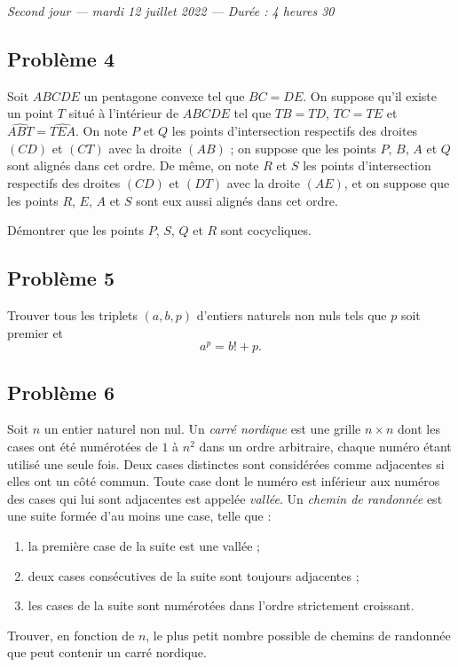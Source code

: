\bigskip
\begin{center}
  \emph{Second jour --- mardi 12 juillet 2022 --- Durée : 4 heures 30}
\end{center}

\subsection*{Problème 4}
Soit $ABCDE$ un pentagone convexe tel que $BC = DE$. On suppose qu'il existe un point $T$ situé à
l'intérieur de $ABCDE$ tel que $TB = TD$, $TC = TE$ et $\widehat{ABT} = \widehat{TEA}$. On note $P$ et $Q$ les
points d'intersection respectifs des droites $(CD)$ et $(CT)$ avec la droite $(AB)$ ; on suppose que les
points $P$, $B$, $A$ et $Q$ sont alignés dans cet ordre. De même, on note $R$ et $S$ les points
d'intersection respectifs des droites $(CD)$ et $(DT)$ avec la droite $(AE)$, et on suppose que les points
$R$, $E$, $A$ et $S$ sont eux aussi alignés dans cet ordre.

Démontrer que les points $P$, $S$, $Q$ et $R$ sont cocycliques.

\subsection*{Problème 5}
Trouver tous les triplets $(a, b, p)$ d'entiers naturels non nuls tels que $p$ soit premier et
\[
a^p = b! + p.
\]

\subsection*{Problème 6}
Soit $n$ un entier naturel non nul. Un \emph{carré nordique} est une grille $n \times n$ dont les cases ont
été numérotées de $1$ à $n^2$ dans un ordre arbitraire, chaque numéro étant utilisé une seule fois. Deux
cases distinctes sont considérées comme adjacentes si elles ont un côté commun. Toute case dont le numéro
est inférieur aux numéros des cases qui lui sont adjacentes est appelée \emph{vallée}.
Un \emph{chemin de randonnée} est une suite formée d'au moins une case, telle que :
\begin{enumerate}
  \item[(i)] la première case de la suite est une vallée ;
  \item[(ii)] deux cases consécutives de la suite sont toujours adjacentes ;
  \item[(iii)] les cases de la suite sont numérotées dans l'ordre strictement croissant.
\end{enumerate}
Trouver, en fonction de $n$, le plus petit nombre possible de chemins de randonnée que peut contenir un
carré nordique.
